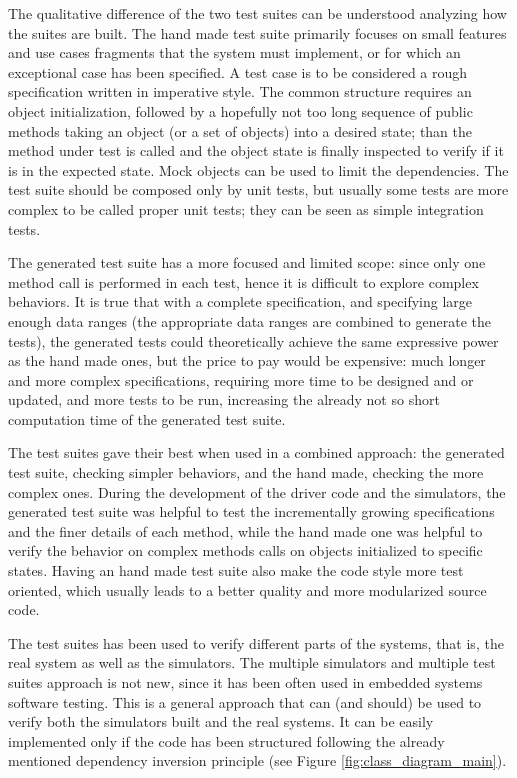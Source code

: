 \documentclass{article} \usepackage{times}
\begin{document}
The qualitative difference of the two test suites can be understood
analyzing how the suites are built. The hand made test suite primarily
focuses on small features and use cases fragments that the system must
implement, or for which an exceptional case has been specified. A test
case is to be considered a rough specification written in imperative
style. The common structure requires an object initialization,
followed by a hopefully not too long sequence of public methods taking
an object (or a set of objects) into a desired state; than the method
under test is called and the object state is finally inspected to
verify if it is in the expected state. Mock objects can be used to
limit the dependencies. The test suite should be composed only by unit
tests, but usually some tests are more complex to be called proper
unit tests; they can be seen as simple integration tests.

The generated test suite has a more focused and limited scope: since
only one method call is performed in each test, hence it is difficult
to explore complex behaviors. It is true that with a complete
specification, and specifying large enough data ranges (the
appropriate data ranges are combined to generate the tests), the
generated tests could theoretically achieve the same expressive power
as the hand made ones, but the price to pay would be expensive: much
longer and more complex specifications, requiring more time to be
designed and or updated, and more tests to be run, increasing the
already not so short computation time of the generated test suite.

The test suites gave their best when used in a combined approach: the
generated test suite, checking simpler behaviors, and the hand made,
checking the more complex ones.  During the development of the driver
code and the simulators, the generated test suite was helpful to test
the incrementally growing specifications and the finer details of each
method, while the hand made one was helpful to verify the behavior on
complex methods calls on objects initialized to specific
states. Having an hand made test suite also make the code style more
test oriented, which usually leads to a better quality and more
modularized source code\cite{Binder1999}.

The test suites has been used to verify different parts of the
systems, that is, the real system as well as the simulators.  The
multiple simulators and multiple test suites approach is not new,
since it has been often used in embedded systems software
testing\cite{Broekman2002}.  This is a general approach that can (and
should) be used to verify both the simulators built and the real
systems.  It can be easily implemented only if the code has been
structured following the already mentioned dependency inversion
principle\cite{martin1996dependency} (see Figure
\ref{fig:class_diagram_main}).
\end{document}
